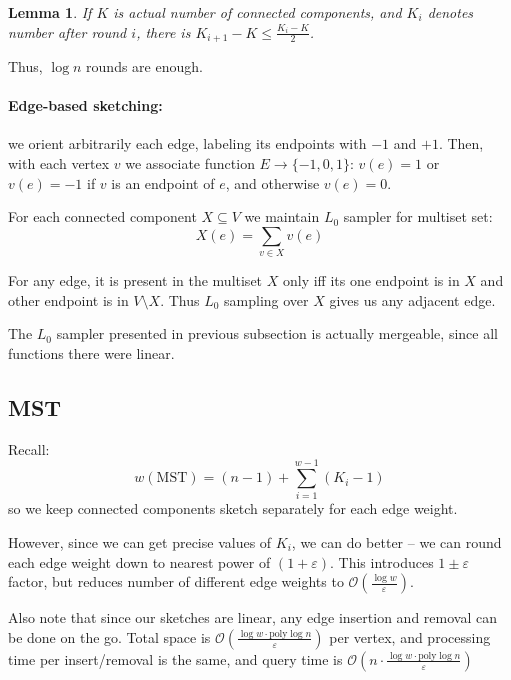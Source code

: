 \documentclass[11pt]{article}
\newtheorem{lemma}[theorem]{Lemma}
\newcommand{\bigo}{\mathcal{O}}
\begin{document}
\begin{lemma}
If $K$ is actual number of connected components, and $K_i$ denotes number after round $i$, there is $K_{i+1} - K \le \frac{K_i - K}{2}$.
\end{lemma}
Thus, $\log n$ rounds are enough.

\paragraph{Edge-based sketching:} we orient arbitrarily each edge, labeling its endpoints with $-1$ and $+1$.
Then, with each vertex $v$ we associate function $E \to \{-1,0,1\}$: $v(e) = 1$ or $v(e) = -1$ if $v$ is an endpoint of $e$, and otherwise $v(e) = 0$.

For each connected component $X \subseteq V$ we maintain $L_0$ sampler for multiset set:
$$X(e) = \sum_{v \in X} v(e)$$

For any edge, it is present in the multiset $X$ only iff its one endpoint is in $X$ and other endpoint is in $V \setminus X$. Thus $L_0$ sampling over $X$ gives us any adjacent edge.

The $L_0$ sampler presented in previous subsection is actually mergeable, since all functions there were linear.

\subsection{MST}
Recall: 
$$w(\text{MST}) = (n-1) + \sum_{i=1}^{w-1} (K_i - 1)$$
so we keep connected components sketch separately for each edge weight.

However, since we can get precise values of $K_i$, we can do better -- we can round each edge weight down to nearest power of $(1+\varepsilon)$. This introduces $1 \pm \varepsilon$ factor, but reduces number of different edge weights to $\bigo(\frac{\log w}{\varepsilon})$.

Also note that since our sketches are linear, any edge insertion and removal can be done on the go. Total space is $\bigo(\frac{\log w \cdot \text{poly} \log n}{\varepsilon})$ per vertex, and processing time per insert/removal is the same, and query time is $\bigo(n \cdot \frac{\log w \cdot \text{poly} \log n}{\varepsilon})$ 
\end{document}
